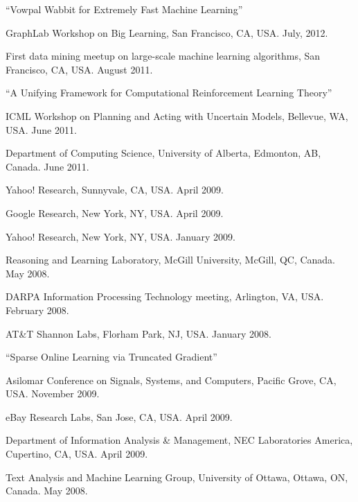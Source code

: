 \documentclass[10pt,twoside,letterpaper]{article}
\newcommand{\negitemspace}{\vspace{1mm}}
\begin{document}
\begin{compactitem}
\item{``Vowpal Wabbit for Extremely Fast Machine Learning''}
\begin{compactitem}
\item{GraphLab Workshop on Big Learning, San Francisco, CA, USA.  July, 2012.}
\item{First data mining meetup on large-scale machine learning algorithms, San Francisco, CA, USA.  August 2011.}
\end{compactitem} \negitemspace

\item{``A Unifying Framework for Computational Reinforcement
Learning Theory''}
\begin{compactitem}
\item{ICML Workshop on Planning and Acting with Uncertain Models, Bellevue, WA, USA.  June 2011.}
\item{Department of Computing Science, University of Alberta, Edmonton, AB, Canada. June 2011.}
\item{Yahoo! Research, Sunnyvale, CA, USA.  April 2009.}
\item{Google Research, New York, NY, USA.  April 2009.}
\item{Yahoo! Research, New York, NY, USA.  January 2009.}
\item{Reasoning and Learning Laboratory, McGill University,
McGill, QC, Canada.  May 2008.}
\item{DARPA Information Processing Technology meeting, Arlington, VA, USA.  February 2008.}
\item{AT\&T Shannon Labs, Florham Park, NJ, USA.  January 2008.}
\end{compactitem} \negitemspace

\item{``Sparse Online Learning via Truncated Gradient''}
\begin{compactitem}
\item{Asilomar Conference on Signals, Systems, and Computers,
Pacific Grove, CA, USA.  November 2009.}
\item{eBay Research Labs, San Jose, CA, USA.  April 2009.}
\item{Department of Information Analysis \& Management, NEC
Laboratories America, Cupertino, CA, USA.  April 2009.}
\item{Text Analysis and Machine Learning Group, University of
Ottawa, Ottawa, ON, Canada.  May 2008.}
\end{compactitem} \negitemspace

\end{compactitem}
\end{document}
